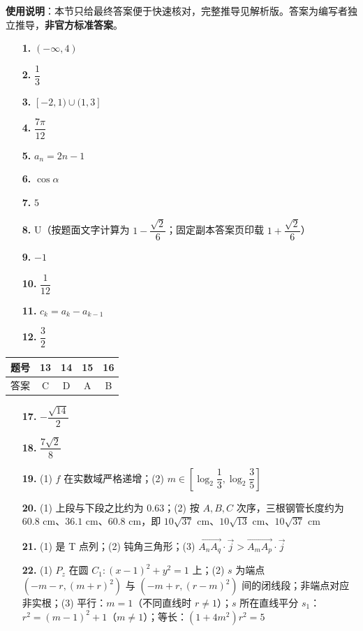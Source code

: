
\begin{gknotice}
\textbf{使用说明}：本节只给最终答案便于快速核对，完整推导见解析版。答案为编写者独立推导，\textbf{非官方标准答案}。
\end{gknotice}

\begin{itemize}[leftmargin=2.6em]
  \item[\textbf{1.}] $(-\infty,4)$
  \item[\textbf{2.}] $\dfrac13$
  \item[\textbf{3.}] $[-2,1)\cup(1,3]$
  \item[\textbf{4.}] $\dfrac{7\pi}{12}$
  \item[\textbf{5.}] $a_n=2n-1$
  \item[\textbf{6.}] $\cos\alpha$
  \item[\textbf{7.}] $5$
  \item[\textbf{8.}] U（按题面文字计算为 $1-\dfrac{\sqrt2}{6}$；固定副本答案页印载 $1+\dfrac{\sqrt2}{6}$）
  \item[\textbf{9.}] $-1$
  \item[\textbf{10.}] $\dfrac1{12}$
  \item[\textbf{11.}] $c_k=a_k-a_{k-1}$
  \item[\textbf{12.}] $\dfrac32$
\end{itemize}

\begin{center}\begin{tabular}{ccccc}
\toprule
题号 & 13 & 14 & 15 & 16 \\
\midrule
答案 & C & D & A & B \\
\bottomrule
\end{tabular}\end{center}

\begin{itemize}[leftmargin=2.6em]
  \item[\textbf{17.}] $-\dfrac{\sqrt{14}}2$
  \item[\textbf{18.}] $\dfrac{7\sqrt2}{8}$
  \item[\textbf{19.}] (1) $f$ 在实数域严格递增；(2) $m\in[\log_2\dfrac13,\log_2\dfrac35]$
  \item[\textbf{20.}] (1) 上段与下段之比约为 $0.63$；(2) 按 $A,B,C$ 次序，三根钢管长度约为 $60.8$ cm、$36.1$ cm、$60.8$ cm，即 $10\sqrt{37}$ cm、$10\sqrt{13}$ cm、$10\sqrt{37}$ cm
  \item[\textbf{21.}] (1) 是 T 点列；(2) 钝角三角形；(3) $\overrightarrow{A_nA_q}\cdot\vec j>\overrightarrow{A_mA_p}\cdot\vec j$
  \item[\textbf{22.}] (1) $P_z$ 在圆 $C_1:(x-1)^2+y^2=1$ 上；(2) $s$ 为端点 $(-m-r,(m+r)^2)$ 与 $(-m+r,(r-m)^2)$ 间的闭线段；非端点对应非实根；(3) 平行：$m=1$（不同直线时 $r\ne1$）；$s$ 所在直线平分 $s_1$：$r^2=(m-1)^2+1$（$m\ne1$）；等长：$(1+4m^2)r^2=5$
\end{itemize}
